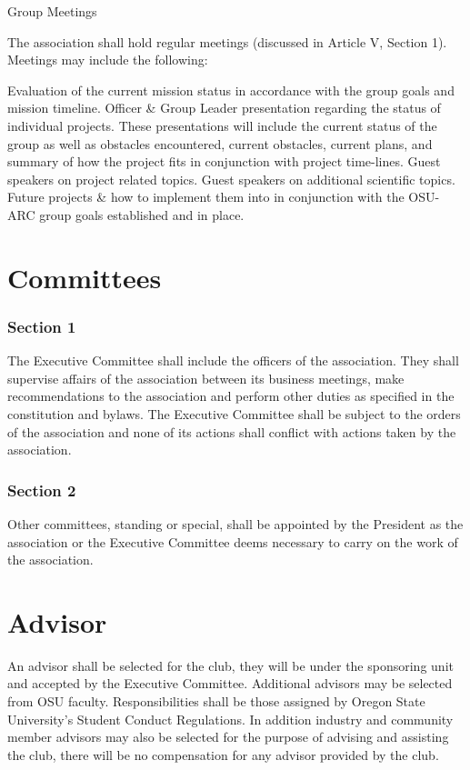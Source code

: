 \documentclass[10pt,letterpaper]{article}
\begin{document}
Group Meetings

The association shall hold regular meetings (discussed in Article V, Section 1). Meetings may include the following:

Evaluation of the current mission status in accordance with the group goals and mission timeline.
Officer \& Group Leader presentation regarding the status of individual projects. These presentations will include the current status of the group as well as obstacles encountered, current obstacles, current plans, and summary of how the project fits in conjunction with project time-lines.
Guest speakers on project related topics.
Guest speakers on additional scientific topics.
Future projects \& how to implement them into in conjunction with the OSU-ARC group goals established and in place.


\part{Committees}

\section*{Section 1} The Executive Committee shall include the officers of the association. They shall supervise affairs of the association between its business meetings, make recommendations to the association and perform other duties as specified in the constitution and bylaws. The Executive Committee shall be subject to the orders of the association and none of its actions shall conflict with actions taken by the association.
\section*{Section 2} Other committees, standing or special, shall be appointed by the President as the association or the Executive Committee deems necessary to carry on the work of the association.


\part{Advisor}

An advisor shall be selected for the club, they will be under the sponsoring unit and accepted by the Executive Committee. Additional advisors may be selected from OSU faculty. Responsibilities shall be those assigned by Oregon State University's Student Conduct Regulations. In addition industry and community member advisors may also be selected for the purpose of advising and assisting the club, there will be no compensation for any advisor provided by the club.
\end{document}
